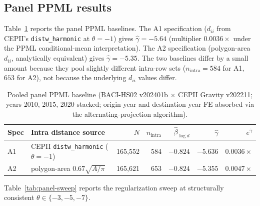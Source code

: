 \documentclass[11pt, letterpaper]{article}
\theoremstyle{definition}
\newcommand{\dii}{d_{ii}}
\begin{document}
\subsection{Panel PPML results}

Table~\ref{tab:panel-baseline} reports the panel PPML baselines. The
A1 specification ($\dii$ from CEPII's \texttt{distw\_harmonic} at
$\theta = -1$) gives $\hat{\gamma} = -5.64$ (multiplier $0.0036\times$
under the PPML conditional-mean interpretation). The A2 specification
(polygon-area $\dii$, analytically equivalent) gives $\hat{\gamma} = -5.35$.
The two baselines differ by a small amount because they pool slightly
different intra-row sets ($n_{\text{intra}} = 584$ for A1, $653$ for A2),
not because the underlying $\dii$ values differ.

\begin{table}[h]
\centering
\small
\caption{Pooled panel PPML baseline (BACI-HS02 v202401b $\times$ CEPII
Gravity v202211; years 2010, 2015, 2020 stacked; origin-year and
destination-year FE absorbed via the
\citet{correia_guimaraes_zylkin_2020} alternating-projection
algorithm).\label{tab:panel-baseline}}
\begin{tabular}{l l r r r r r}
\toprule
Spec & Intra distance source & $N$ & $n_{\text{intra}}$ & $\hat{\beta}_{\log d}$ & $\hat{\gamma}$ & $e^{\hat{\gamma}}$ \\
\midrule
A1 & CEPII \texttt{distw\_harmonic} ($\theta = -1$) & 165{,}552 & 584 & $-0.824$ & $-5.636$ & $0.0036\times$ \\
A2 & polygon-area $0.67\sqrt{A/\pi}$              & 165{,}621 & 653 & $-0.824$ & $-5.355$ & $0.0047\times$ \\
\bottomrule
\end{tabular}
\end{table}

Table~\ref{tab:panel-sweep} reports the regularization sweep at
structurally consistent $\theta \in \{-3, -5, -7\}$.
\end{document}
